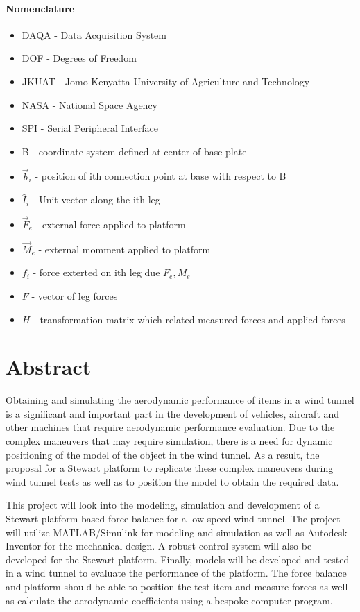 \paragraph{Nomenclature}
\begin{itemize}
\item DAQA - Data Acquisition System
\item DOF - Degrees of Freedom
\item JKUAT - Jomo Kenyatta University of Agriculture and Technology
\item NASA - National Space Agency
\item SPI - Serial Peripheral Interface
\item B - coordinate system defined at center of base plate
\item $\vec{b}_i$ - position of ith connection point at base with respect to B
\item $\hat{I}_i$ - Unit vector along the ith leg
\item $\vec{F}_e$ - external force applied to platform
\item $\vec{M}_e$ - external momment applied to platform
\item $f_i$ - force exterted on ith leg due $F_e, M_e$
\item $F$ - vector of leg forces
\item $H$ - transformation matrix which related measured forces and applied forces 
\end{itemize}
\pagebreak
{}

\section*{Abstract}
\label{sec:Abstract}
Obtaining and simulating the aerodynamic performance of items in a wind tunnel is a
significant and important part in the development of vehicles, aircraft and other machines
that require aerodynamic performance evaluation. Due to the complex maneuvers that may require simulation, there is a need for dynamic positioning of the model of the object in the wind tunnel. As a result, the proposal for a Stewart platform to replicate these complex maneuvers during wind tunnel tests as well as to position the model to obtain the required data.

This project will look into the modeling, simulation and development of a Stewart
platform based force balance for a low speed wind tunnel. The project will utilize
MATLAB/Simulink for modeling and simulation as well as Autodesk Inventor for the mechanical
design. A robust control system will also be developed for the Stewart platform.
Finally, models will be developed and tested in a wind tunnel to evaluate the performance
of the platform. The force balance and platform should be able to position the test
item and measure forces as well as calculate the aerodynamic coefficients using a bespoke computer program.




